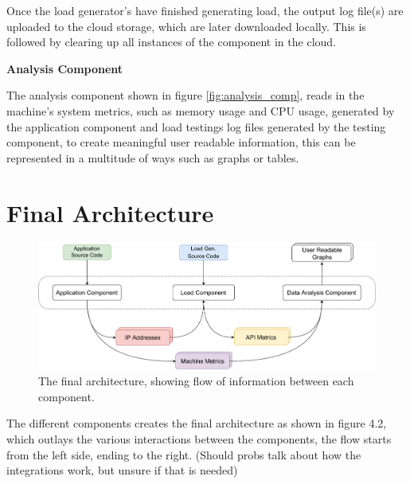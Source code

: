 Once the load generator's have finished generating load, the output log file(s) are uploaded to the cloud storage, which are later downloaded locally. This is followed by clearing up all instances of the component in the cloud. 

\textbf{Analysis Component}

The analysis component shown in figure \ref{fig:analysis_comp}, reads in the machine's system metrics, such as memory usage and CPU usage, generated by the application component and load testings log files generated by the testing component, to create meaningful user readable information, this can be represented in a multitude of ways such as graphs or tables. 

\section{Final Architecture}
\begin{figure}[H]
    \centering
    \includegraphics[width=1\linewidth]{images/final_arch.pdf}
    \caption{The final architecture, showing flow of information between each component.}
    \label{fig:final_arch}
\end{figure} 
The different components creates the final architecture as shown in figure 4.2, which outlays the various interactions between the components, the flow starts from the left side, ending to the right. (Should probs talk about how the integrations work, but unsure if that is needed) 

